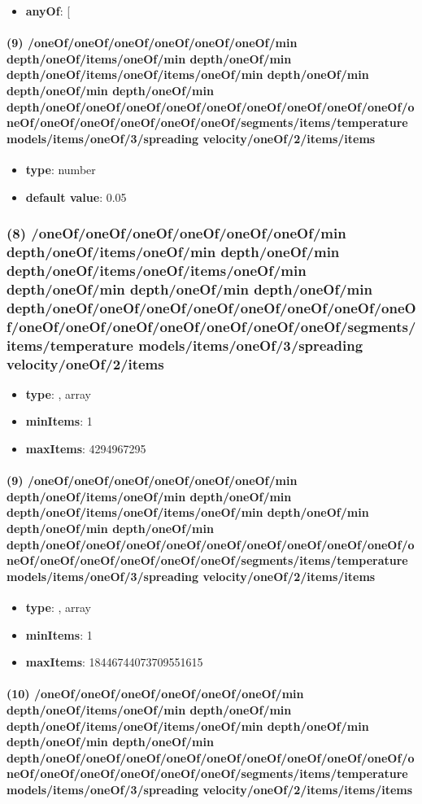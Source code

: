\begin{itemize}[leftmargin=9em]\item {\bf anyOf}: [\end{itemize}\paragraph{(9) /oneOf/oneOf/oneOf/oneOf/oneOf/oneOf/min depth/oneOf/items/oneOf/min depth/oneOf/min depth/oneOf/items/oneOf/items/oneOf/min depth/oneOf/min depth/oneOf/min depth/oneOf/min depth/oneOf/oneOf/oneOf/oneOf/oneOf/oneOf/oneOf/oneOf/oneOf/oneOf/oneOf/oneOf/oneOf/oneOf/oneOf/segments/items/temperature models/items/oneOf/3/spreading velocity/oneOf/2/items/items}
\begin{itemize}[leftmargin=9em]\item {\bf type}: number\item {\bf default value}: 0.05
\end{itemize}\subsubsection{(8) /oneOf/oneOf/oneOf/oneOf/oneOf/oneOf/min depth/oneOf/items/oneOf/min depth/oneOf/min depth/oneOf/items/oneOf/items/oneOf/min depth/oneOf/min depth/oneOf/min depth/oneOf/min depth/oneOf/oneOf/oneOf/oneOf/oneOf/oneOf/oneOf/oneOf/oneOf/oneOf/oneOf/oneOf/oneOf/oneOf/oneOf/segments/items/temperature models/items/oneOf/3/spreading velocity/oneOf/2/items}
\begin{itemize}[leftmargin=8em]\item {\bf type}: , array\item {\bf minItems}: 1
\item {\bf maxItems}: 4294967295
\end{itemize}\paragraph{(9) /oneOf/oneOf/oneOf/oneOf/oneOf/oneOf/min depth/oneOf/items/oneOf/min depth/oneOf/min depth/oneOf/items/oneOf/items/oneOf/min depth/oneOf/min depth/oneOf/min depth/oneOf/min depth/oneOf/oneOf/oneOf/oneOf/oneOf/oneOf/oneOf/oneOf/oneOf/oneOf/oneOf/oneOf/oneOf/oneOf/oneOf/segments/items/temperature models/items/oneOf/3/spreading velocity/oneOf/2/items/items}
\begin{itemize}[leftmargin=9em]\item {\bf type}: , array\item {\bf minItems}: 1
\item {\bf maxItems}: 18446744073709551615
\end{itemize}\paragraph{(10) /oneOf/oneOf/oneOf/oneOf/oneOf/oneOf/min depth/oneOf/items/oneOf/min depth/oneOf/min depth/oneOf/items/oneOf/items/oneOf/min depth/oneOf/min depth/oneOf/min depth/oneOf/min depth/oneOf/oneOf/oneOf/oneOf/oneOf/oneOf/oneOf/oneOf/oneOf/oneOf/oneOf/oneOf/oneOf/oneOf/oneOf/segments/items/temperature models/items/oneOf/3/spreading velocity/oneOf/2/items/items/items}

